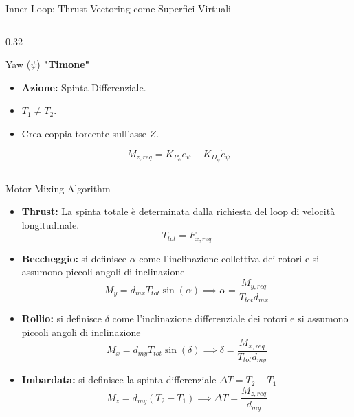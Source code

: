 \documentclass[aspectratio=169]{beamer} %
\begin{document}
\begin{frame}{Inner Loop: Thrust Vectoring come Superfici Virtuali}
\begin{columns}[T]
        \begin{column}{0.32\textwidth}
            \begin{exampleblock}{Yaw ($\psi$)}
                \centering \textbf{"Timone"}
                \vspace{0.2cm}
                \begin{itemize}
                    \item \textbf{Azione:} Spinta Differenziale.
                    \item $T_1 \neq T_2$.
                    \item Crea coppia torcente sull'asse $Z$.
                \end{itemize}
                \begin{equation}
                    M_{z,req} = K_{P_\psi} e_\psi + K_{D_\psi} \dot{e}_{\psi}
                \end{equation}
            \end{exampleblock}
        \end{column}
    \end{columns}
\end{frame}


\begin{frame}{Motor Mixing Algorithm}

    \begin{itemize}
        \item \textbf{Thrust:}
            La spinta totale è determinata dalla richiesta del loop di velocità longitudinale.
            \begin{equation}
                T_{tot} = F_{x,req} 
            \end{equation}
        \item \textbf{Beccheggio:} si definisce $\alpha$ come l'inclinazione collettiva dei rotori e si assumono piccoli angoli di inclinazione
            \begin{equation}
                M_y = d_{mx} T_{tot} \sin(\alpha)
                \implies \alpha = \frac{M_{y,req}}{T_{tot} d_{mx}}
            \end{equation}

        \item \textbf{Rollio:} si definisce $\delta$ come l'inclinazione differenziale dei rotori e si assumono piccoli angoli di inclinazione
            \begin{equation}
                M_x = d_{my} T_{tot} \sin(\delta)
                \implies \delta = \frac{M_{x,req}}{T_{tot} d_{my}}
            \end{equation}

        \item \textbf{Imbardata:} si definisce la spinta differenziale $\Delta T = T_2 - T_1$
            \begin{equation}
                M_z = d_{my} (T_2 - T_1)
                \implies \Delta T = \frac{M_{z,req}}{d_{my}}
            \end{equation}
    \end{itemize}
\end{frame}
\end{document}
